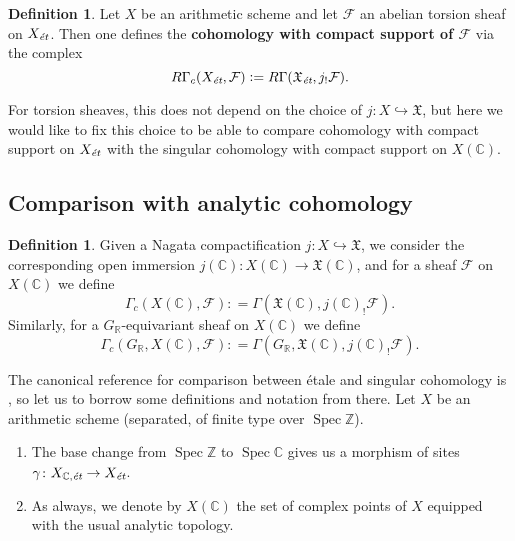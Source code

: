 \documentclass{article}
\DeclareMathOperator{\Spec}{Spec}
\newcommand{\CC}{\mathbb{C}}
\newcommand{\RR}{\mathbb{R}}
\newcommand{\ZZ}{\mathbb{Z}}
\newcommand{\et}{\text{\it ét}}
\newcommand{\dfn}{\mathrel{\mathop:}=}
\theoremstyle{definition}
\newtheorem{definition}[theorem]{Definition}
\numberwithin{equation}{section}
\begin{document}
\begin{appendices}
\begin{definition}
  Let $X$ be an arithmetic scheme and let $\mathcal{F}$ an abelian torsion
  sheaf on $X_\et$. Then one defines the
  \textbf{cohomology with compact support of $\mathcal{F}$} via the complex
  \begin{equation}
    \label{eqn:RGammac-via-extension-by-zero}
    R\Gamma_c (X_\et, \mathcal{F}) \dfn
    R\Gamma (\mathfrak{X}_\text{\it \'et}, j_! \mathcal{F}).
  \end{equation}
\end{definition}

For torsion sheaves, this does not depend on the choice of
$j\colon X \hookrightarrow \mathfrak{X}$, but here we would like to fix this
choice to be able to compare cohomology with compact support on $X_\et$ with
the singular cohomology with compact support on $X (\CC)$.

\subsection*{Comparison with analytic cohomology}

\begin{definition}
  Given a Nagata compactification $j\colon X\hookrightarrow \mathfrak{X}$,
  we consider the corresponding open immersion
  $j (\CC)\colon X (\CC) \to \mathfrak{X} (\CC)$,
  and for a sheaf $\mathcal{F}$ on $X (\CC)$ we define
  \[ \Gamma_c (X (\CC), \mathcal{F}) \dfn
  \Gamma (\mathfrak{X} (\CC), j (\CC)_! \mathcal{F}). \]
  Similarly, for a $G_\RR$-equivariant sheaf on $X (\CC)$ we define
  \[ \Gamma_c (G_\RR, X (\CC), \mathcal{F}) \dfn
  \Gamma (G_\RR, \mathfrak{X} (\CC), j (\CC)_! \mathcal{F}). \]
\end{definition}

The canonical reference for comparison between étale and singular cohomology is
\cite[Exposé~XI, \S 4]{SGA4}, so let us to borrow some definitions and notation
from there. Let $X$ be an arithmetic scheme (separated, of finite type over
$\Spec \ZZ$).

\begin{enumerate}
\item The base change from $\Spec \ZZ$ to $\Spec \CC$ gives us a morphism of
  sites
  $\gamma\colon X_{\CC,\text{\it ét}} \to X_\et$.

\item As always, we denote by $X (\CC)$ the set of complex points of $X$
  equipped with the usual analytic topology.


\end{enumerate}
\end{appendices}
\end{document}
